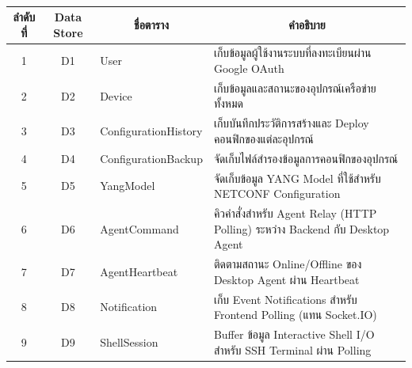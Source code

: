 \begin{table}[H]
    \caption{}
    \label{tab:database_tables}
    \fontSixTeen 
    \begin{tabularx}{\textwidth}{|c|c|l|X|} 
        \hline
        \textbf{ลำดับที่} & \textbf{Data Store} & \multicolumn{1}{c|}{\textbf{ชื่อตาราง}} & \multicolumn{1}{c|}{\textbf{คำอธิบาย}} \\
        \hline
        1 & D1 & User & เก็บข้อมูลผู้ใช้งานระบบที่ลงทะเบียนผ่าน Google OAuth \\
        \hline
        2 & D2 & Device & เก็บข้อมูลและสถานะของอุปกรณ์เครือข่ายทั้งหมด \\
        \hline
        3 & D3 & ConfigurationHistory & เก็บบันทึกประวัติการสร้างและ Deploy คอนฟิกของแต่ละอุปกรณ์ \\
        \hline
        4 & D4 & ConfigurationBackup & จัดเก็บไฟล์สำรองข้อมูลการคอนฟิกของอุปกรณ์ \\
        \hline
        5 & D5 & YangModel & จัดเก็บข้อมูล YANG Model ที่ใช้สำหรับ NETCONF Configuration \\
        \hline
        6 & D6 & AgentCommand & คิวคำสั่งสำหรับ Agent Relay (HTTP Polling) ระหว่าง Backend กับ Desktop Agent \\
        \hline
        7 & D7 & AgentHeartbeat & ติดตามสถานะ Online/Offline ของ Desktop Agent ผ่าน Heartbeat \\
        \hline
        8 & D8 & Notification & เก็บ Event Notifications สำหรับ Frontend Polling (แทน Socket.IO) \\
        \hline
        9 & D9 & ShellSession & Buffer ข้อมูล Interactive Shell I/O สำหรับ SSH Terminal ผ่าน Polling \\
        \hline
    \end{tabularx}
\end{table}


